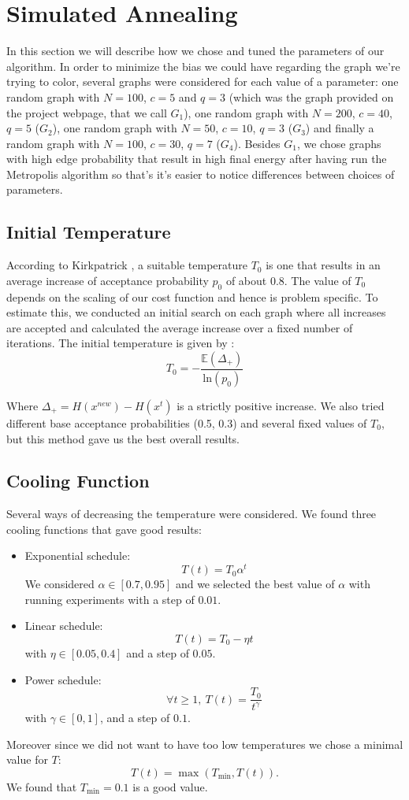 \documentclass[a4paper]{article}
\begin{document}
\section{Simulated Annealing}
In this section we will describe how we chose and tuned the parameters of our algorithm. In order to minimize the bias we could have regarding the graph we're trying to color, several graphs were considered for each value of a parameter: one random graph with $N=100$, $c=5$ and $q=3$ (which was the graph provided on the project webpage, that we call $G_1$), one random graph with $N=200$, $c=40$, $q=5$ ($G_2$), one random graph with $N=50$, $c=10$, $q=3$ ($G_3$) and finally a random graph with $N=100$, $c=30$, $q=7$ ($G_4$). Besides $G_1$, we chose graphs with high edge probability that result in high final energy after having run the Metropolis algorithm so that's it's easier to notice differences between choices of parameters.

\subsection{Initial Temperature}
According to Kirkpatrick \cite{kirkpatrick}, a suitable temperature $T_0$ is one that results in an average increase of acceptance probability $p_0$ of about 0.8. The value of $T_0$ depends on the scaling of our cost function and hence is problem specific. To estimate this, we conducted an initial search on each graph where all increases are accepted and calculated the average increase over a fixed number of iterations. The initial temperature is given by :
$$T_0=-\dfrac{\mathbb{E}(\Delta_+)}{\mathrm{ln}(p_0)}$$

Where $\Delta_+ = H(x^{new}) - H(x^t)$ is a strictly positive increase. We also tried different base acceptance probabilities (0.5, 0.3) and several fixed values of $T_0$, but this method gave us the best overall results.

\subsection{Cooling Function}
Several ways of decreasing the temperature were considered. We found three cooling functions that gave good results:
\begin{itemize}
\item Exponential schedule: $$T(t)=T_0 \alpha^t$$
We considered $\alpha \in [0.7,0.95]$ and we selected the best value of $\alpha$ with running experiments with a step of $0.01$.
\item Linear schedule: $$T(t)=T_0 -\eta t$$ with $\eta \in [0.05,0.4]$ and a step of $0.05$.
\item Power schedule: $$\forall t \geqslant 1, \ T(t)=\dfrac{T_0}{t^{\gamma}}$$ with $\gamma \in [0,1]$, and a step of $0.1$.
\end{itemize}
Moreover since we did not want to have too low temperatures we chose a minimal value for $T$: $$T(t)=\max(T_{\min},T(t)).$$ We found that $T_{\min}=0.1$ is a good value. 
\\
\end{document}
